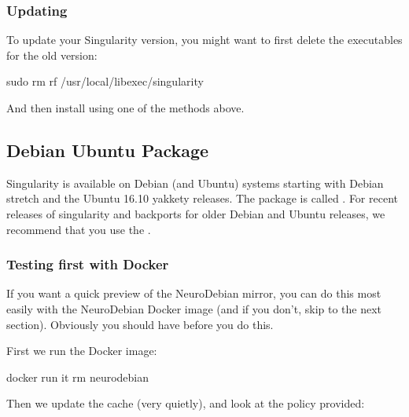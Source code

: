 \documentclass[letterpaper,10pt,english]{sphinxmanual}
\begin{document}
\subsubsection{Updating}
\label{\detokenize{installation:updating}}
To update your Singularity version, you might want to first delete the executables for the old version:

%
\begin{sphinxVerbatim}[commandchars=\\\{\}]
sudo rm \PYGZhy{}rf /usr/local/libexec/singularity
\end{sphinxVerbatim}

And then install using one of the methods above.


\subsection{Debian Ubuntu Package}
\label{\detokenize{installation:debian-ubuntu-package}}
Singularity is available on Debian (and Ubuntu) systems starting with Debian stretch and the Ubuntu 16.10 yakkety releases.
The package is called . For recent releases of singularity and backports for older Debian and Ubuntu releases,
we recommend that you use the .


\subsubsection{Testing first with Docker}
\label{\detokenize{installation:testing-first-with-docker}}
If you want a quick preview of the NeuroDebian mirror, you can do this most easily with the NeuroDebian Docker image (and if you don’t, skip to the next section). Obviously you should have  before you do this.

First we run the  Docker image:

%
\begin{sphinxVerbatim}[commandchars=\\\{\}]
\PYGZdl{} docker run \PYGZhy{}it \PYGZhy{}\PYGZhy{}rm neurodebian
\end{sphinxVerbatim}

Then we update the cache (very quietly), and look at the  policy provided:
\end{document}
